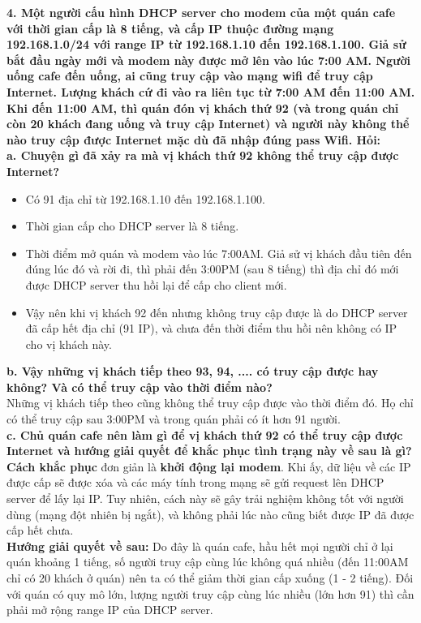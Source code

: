 \textbf{4.	Một người cấu hình DHCP server cho modem của một quán cafe với thời gian cấp là 8 tiếng, và cấp IP thuộc đường mạng 192.168.1.0/24 với range IP từ 192.168.1.10 đến 192.168.1.100. Giả sử bắt đầu ngày mới và modem này được mở lên vào lúc 7:00 AM. Người uống cafe đến uống, ai cũng truy cập vào mạng wifi để truy cập Internet. Lượng khách cứ đi vào ra liên tục từ 7:00 AM đến 11:00 AM. Khi đến 11:00 AM, thì quán đón vị khách thứ 92 (và trong quán chỉ còn 20 khách đang uống và truy cập Internet) và người này không thể nào truy cập được Internet mặc dù đã nhập đúng pass Wifi. Hỏi:}\\
\textbf{a.	Chuyện gì đã xảy ra mà vị khách thứ 92 không thể truy cập được Internet?}
\begin{itemize}
\item Có 91 địa chỉ từ 192.168.1.10 đến 192.168.1.100.
\item Thời gian cấp cho DHCP server là 8 tiếng.
\item Thời điểm mở quán và modem vào lúc 7:00AM. Giả sử vị khách đầu tiên đến đúng lúc đó và rời đi, thì phải đến 3:00PM (sau 8 tiếng) thì địa chỉ đó mới được DHCP server thu hồi lại để cấp cho client mới.
\item Vậy nên khi vị khách 92 đến nhưng không truy cập được là do DHCP server đã cấp hết địa chỉ (91 IP), và chưa đến thời điểm thu hồi nên không có IP cho vị khách này.
\end{itemize}

\textbf{b.	Vậy những vị khách tiếp theo 93, 94, .... có truy cập được hay không? Và có thể truy cập vào thời điểm nào?}\\
Những vị khách tiếp theo cũng không thể truy cập được vào thời điểm đó. Họ chỉ có thể truy cập sau 3:00PM và trong quán phải có ít hơn 91 người.\\

\textbf{c.	Chủ quán cafe nên làm gì để vị khách thứ 92 có thể truy cập được Internet và hướng giải quyết để khắc phục tình trạng này về sau là gì?}\\
\textbf{Cách khắc phục} đơn giản là \textbf{khởi động lại modem}. Khi ấy, dữ liệu về các IP được cấp sẽ được xóa và các máy tính trong mạng sẽ gửi request lên DHCP server để lấy lại IP. Tuy nhiên, cách này sẽ gây trải nghiệm không tốt với người dùng (mạng đột nhiên bị ngắt), và không phải lúc nào cũng biết được IP đã được cấp hết chưa.\\
\textbf{Hướng giải quyết về sau:} Do đây là quán cafe, hầu hết mọi người chỉ ở lại quán khoảng 1 tiếng, số người truy cập cùng lúc không quá nhiều (đến 11:00AM chỉ có 20 khách ở quán) nên ta có thể giảm thời gian cấp xuống (1 - 2 tiếng). Đối với quán có quy mô lớn, lượng người truy cập cùng lúc nhiều (lớn hơn 91) thì cần phải mở rộng range IP của DHCP server.

